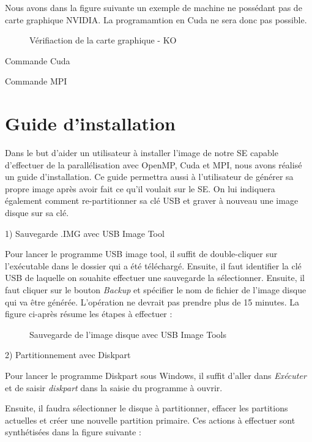 \documentclass[final]{polytech/polytech}
\begin{document}
Nous avons dans la figure suivante un exemple de machine ne possédant pas de carte graphique NVIDIA. La programamtion en Cuda ne sera donc pas possible.

\begin{figure}
	\caption{Vérifiaction de la carte graphique - KO}
	\label{fig:check_gpu_ko}
\end{figure}

Commande Cuda

Commande MPI

\part{Guide d'installation}
Dans le but d'aider un utilisateur à installer l'image de notre SE capable d'effectuer de la parallélisation avec OpenMP, Cuda et MPI, nous avons réalisé un guide d'installation. Ce guide permettra aussi à l'utilisateur de générer sa propre image après avoir fait ce qu'il voulait sur le SE. On lui indiquera également comment re-partitionner sa clé USB et graver à nouveau une image disque sur sa clé.

1) Sauvegarde .IMG avec USB Image Tool

Pour lancer le programme USB image tool, il suffit de double-cliquer sur l'exécutable dans le dossier qui a été téléchargé. Ensuite, il faut identifier la clé USB de laquelle on souahite effectuer une sauvegarde la sélectionner. Ensuite, il faut cliquer sur le bouton \textit{Backup} et spécifier le nom de fichier de l'image disque qui va être générée. L'opération ne devrait pas prendre plus de 15 minutes. La figure ci-après résume les étapes à effectuer :

\begin{figure}
	\caption{Sauvegarde de l'image disque avec USB Image Tools}
	\label{fig:usb_image_tools_backup}
\end{figure}

\vspace{1\baselineskip}

2) Partitionnement avec Diskpart

Pour lancer le programme Diskpart sous Windows, il suffit d'aller dans \textit{Exécuter} et de saisir \textit{diskpart} dans la saisie du programme à ouvrir.

Ensuite, il faudra sélectionner le disque à partitionner, effacer les partitions actuelles et créer une nouvelle partition primaire. Ces actions à effectuer sont synthétisées dans la figure suivante :
\end{document}
